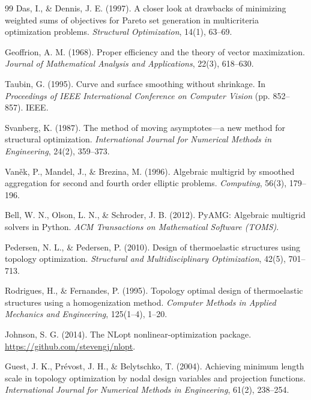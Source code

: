 \documentclass[11pt, a4paper]{article}
\begin{document}
\begin{thebibliography}{99}
Das, I., \& Dennis, J. E. (1997). A closer look at drawbacks of minimizing weighted sums of objectives for Pareto set generation in multicriteria optimization problems. \textit{Structural Optimization}, 14(1), 63--69.

Geoffrion, A. M. (1968). Proper efficiency and the theory of vector maximization. \textit{Journal of Mathematical Analysis and Applications}, 22(3), 618--630.

Taubin, G. (1995). Curve and surface smoothing without shrinkage. In \textit{Proceedings of IEEE International Conference on Computer Vision} (pp. 852--857). IEEE.

Svanberg, K. (1987). The method of moving asymptotes---a new method for structural optimization. \textit{International Journal for Numerical Methods in Engineering}, 24(2), 359--373.

Van\v{e}k, P., Mandel, J., \& Brezina, M. (1996). Algebraic multigrid by smoothed aggregation for second and fourth order elliptic problems. \textit{Computing}, 56(3), 179--196.

Bell, W. N., Olson, L. N., \& Schroder, J. B. (2012). PyAMG: Algebraic multigrid solvers in Python. \textit{ACM Transactions on Mathematical Software (TOMS)}.

Pedersen, N. L., \& Pedersen, P. (2010). Design of thermoelastic structures using topology optimization. \textit{Structural and Multidisciplinary Optimization}, 42(5), 701--713.

Rodrigues, H., \& Fernandes, P. (1995). Topology optimal design of thermoelastic structures using a homogenization method. \textit{Computer Methods in Applied Mechanics and Engineering}, 125(1--4), 1--20.

Johnson, S. G. (2014). The NLopt nonlinear-optimization package. \url{https://github.com/stevengj/nlopt}.

Guest, J. K., Pr\'evost, J. H., \& Belytschko, T. (2004). Achieving minimum length scale in topology optimization by nodal design variables and projection functions. \textit{International Journal for Numerical Methods in Engineering}, 61(2), 238--254.
\end{thebibliography}
\end{document}
